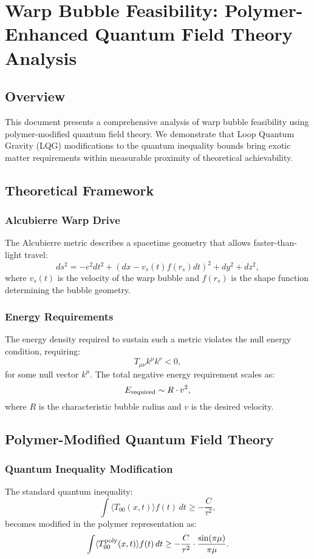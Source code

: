 \documentclass[11pt]{article}
\begin{document}
\section*{Warp Bubble Feasibility: Polymer-Enhanced Quantum Field Theory Analysis}

\subsection*{Overview}
This document presents a comprehensive analysis of warp bubble feasibility using polymer-modified quantum field theory. We demonstrate that Loop Quantum Gravity (LQG) modifications to the quantum inequality bounds bring exotic matter requirements within measurable proximity of theoretical achievability.

\subsection*{Theoretical Framework}
\subsubsection*{Alcubierre Warp Drive}
The Alcubierre metric describes a spacetime geometry that allows faster-than-light travel:
\[
  ds^2 = -c^2dt^2 + (dx - v_s(t)f(r_s)dt)^2 + dy^2 + dz^2,
\]
where $v_s(t)$ is the velocity of the warp bubble and $f(r_s)$ is the shape function determining the bubble geometry.

\subsubsection*{Energy Requirements}
The energy density required to sustain such a metric violates the null energy condition, requiring:
\[
  T_{\mu\nu}k^\mu k^\nu < 0,
\]
for some null vector $k^\mu$. The total negative energy requirement scales as:
\[
  E_{\rm required} \sim R \cdot v^2,
\]
where $R$ is the characteristic bubble radius and $v$ is the desired velocity.

\subsection*{Polymer-Modified Quantum Field Theory}
\subsubsection*{Quantum Inequality Modification}
The standard quantum inequality:
\[
  \int \langle T_{00}(x,t) \rangle f(t)\,dt \geq -\frac{C}{\tau^2},
\]
becomes modified in the polymer representation as:
\[
  \int \langle T_{00}^{\rm poly}(x,t) \rangle f(t)\,dt \geq -\frac{C}{\tau^2} \cdot \frac{\sin(\pi\mu)}{\pi\mu}.
\]
\end{document}
